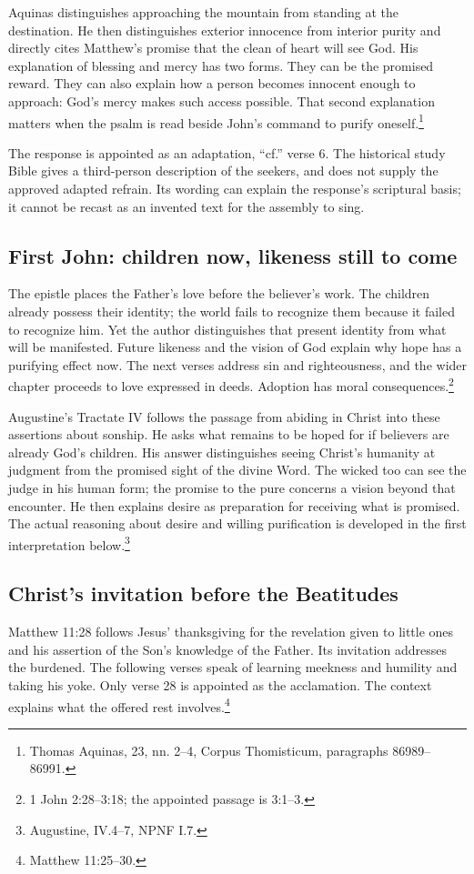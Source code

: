 Aquinas distinguishes approaching the mountain from standing at the destination. He then distinguishes exterior innocence from interior purity and directly cites Matthew's promise that the clean of heart will see God. His explanation of blessing and mercy has two forms. They can be the promised reward. They can also explain how a person becomes innocent enough to approach: God's mercy makes such access possible. That second explanation matters when the psalm is read beside John's command to purify oneself.\footnote{Thomas Aquinas,  23, nn. 2--4, Corpus Thomisticum, paragraphs 86989--86991.}

The response is appointed as an adaptation, ``cf.'' verse 6. The historical study Bible gives a third-person description of the seekers, and does not supply the approved adapted refrain. Its wording can explain the response's scriptural basis; it cannot be recast as an invented text for the assembly to sing.

\subsection{First John: children now, likeness still to come}
The epistle places the Father's love before the believer's work. The children already possess their identity; the world fails to recognize them because it failed to recognize him. Yet the author distinguishes that present identity from what will be manifested. Future likeness and the vision of God explain why hope has a purifying effect now. The next verses address sin and righteousness, and the wider chapter proceeds to love expressed in deeds. Adoption has moral consequences.\footnote{1 John 2:28--3:18; the appointed passage is 3:1--3.}

Augustine's Tractate IV follows the passage from abiding in Christ into these assertions about sonship. He asks what remains to be hoped for if believers are already God's children. His answer distinguishes seeing Christ's humanity at judgment from the promised sight of the divine Word. The wicked too can see the judge in his human form; the promise to the pure concerns a vision beyond that encounter. He then explains desire as preparation for receiving what is promised. The actual reasoning about desire and willing purification is developed in the first interpretation below.\footnote{Augustine,  IV.4--7, NPNF I.7.}

\subsection{Christ's invitation before the Beatitudes}
Matthew 11:28 follows Jesus' thanksgiving for the revelation given to little ones and his assertion of the Son's knowledge of the Father. Its invitation addresses the burdened. The following verses speak of learning meekness and humility and taking his yoke. Only verse 28 is appointed as the acclamation. The context explains what the offered rest involves.\footnote{Matthew 11:25--30.}


